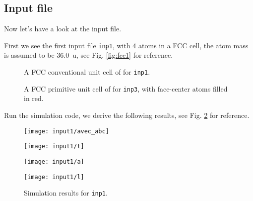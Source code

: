 
\subsection{Input file}

Now let's have a look at the input file.

First we see the first input file \texttt{inp1}, with $4$  atoms in a FCC cell,
the atom mass is assumed to be \SI{36.0}{\atomicmassunit},
see Fig. \ref{fig:fcc1} for reference.

\begin{figure}[H]
  \begin{minipage}{0.48\textwidth}
    \centering
    
    \caption{A FCC conventional unit cell of  for \texttt{inp1}.}
    \label{fig:fcc1}
  \end{minipage}
\hfill
  \begin {minipage}{0.48\textwidth}
  \centering
  
  \caption{A FCC primitive unit cell of  for \texttt{inp3}, with
  face-center atoms filled in red.}
  \label{fig:fcc3}
\end{minipage}
\end{figure}

Run the simulation code, we derive the following results,
see Fig. \ref{fig:input1} for reference.
\begin{figure}[H]
 \centering
 \begin{minipage}[t]{0.45\textwidth}
  \texttt{[image: input1/avec\_abc]}
  \label{fig:input1:avec}
 \end{minipage}
 \hfil
 \begin{minipage}[t]{0.45\textwidth}
  \texttt{[image: input1/t]}
  \label{fig:input1:e}
 \end{minipage}
 \hfil
 \vfill
 \begin{minipage}[t]{0.45\textwidth}
  \texttt{[image: input1/a]}
  \label{fig:input1:a}
 \end{minipage}
 \hfil
 \begin{minipage}[t]{0.45\textwidth}
  \texttt{[image: input1/l]}
  \label{fig:input1:l}
 \end{minipage}
 \caption{Simulation results for \texttt{inp1}.}
 \label{fig:input1}
\end{figure}

